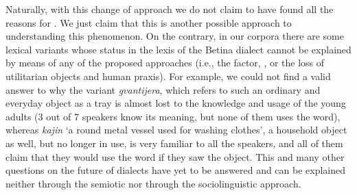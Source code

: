 \documentclass[output=paper]{LSP/langsci}
\begin{document}
Naturally, with this change of approach we do not claim to have found all the reasons for . We just claim that this is another possible approach to understanding this phenomenon. On the contrary, in our corpora there are some lexical variants whose status in the lexis of the Betina dialect cannot be explained by means of any of the proposed approaches (i.e., the  factor, , or the loss of utilitarian objects and human praxis). For example, we could not find a valid answer to why the variant \textit{gvantijera}, which refers to such an ordinary and everyday object as a tray is almost lost to the knowledge and usage of the young adults (3 out of 7 speakers know its meaning, but none of them uses the word), whereas \textit{kajin} ‘a round metal vessel used for washing clothes’, a household object as well, but no longer in use, is very familiar to all the speakers, and all of them claim that they would use the word if they saw the object. This and many other questions on the future of dialects have yet to be answered and can be explained neither through the semiotic nor through the sociolinguistic approach.

\printbibliography[heading=subbibliography,notkeyword=this]
\end{document}
